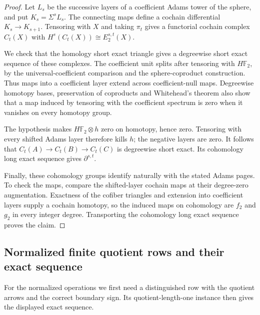 \begin{proof}
Let $L_s$ be the successive layers of a coefficient Adams tower of the
sphere, and put $K_s=\Sigma^sL_s$. The connecting maps define a
cochain differential $K_s\to K_{s+1}$. Tensoring with $X$ and taking
$\pi_t$ gives a functorial cochain complex $C_t(X)$ with
$H^s(C_t(X))\cong E_2^{s,t}(X)$.

We check that the homology short exact triangle gives a degreewise
short exact sequence of these complexes. The coefficient unit splits
after tensoring with $H\mathbb F_2$, by the universal-coefficient
comparison and the sphere-coproduct construction. Thus maps into a
coefficient layer extend across coefficient-null maps. Degreewise
homotopy bases, preservation of coproducts and Whitehead's theorem
also show that a map induced by tensoring with the coefficient
spectrum is zero when it vanishes on every homotopy group.

The hypothesis makes $H\mathbb F_2\otimes h$ zero on homotopy, hence
zero. Tensoring with every shifted Adams layer therefore kills $h$;
the negative layers are zero. It follows that
$C_t(A)\to C_t(B)\to C_t(C)$ is degreewise short exact. Its cohomology
long exact sequence gives $\partial^{s,t}$.

Finally, these cohomology groups identify naturally with the stated
Adams pages. To check the maps, compare the shifted-layer cochain maps
at their degree-zero augmentation. Exactness of the cofiber triangles
and extension into coefficient layers supply a cochain homotopy, so
the induced maps on cohomology are $f_2$ and $g_2$ in every integer
degree. Transporting the cohomology long exact sequence proves the claim.
\end{proof}

\subsection{Normalized finite quotient rows and their exact sequence}
For the normalized operations we first need a distinguished row with
the quotient arrows and the correct boundary sign. Its
quotient-length-one instance then gives the displayed exact sequence.

